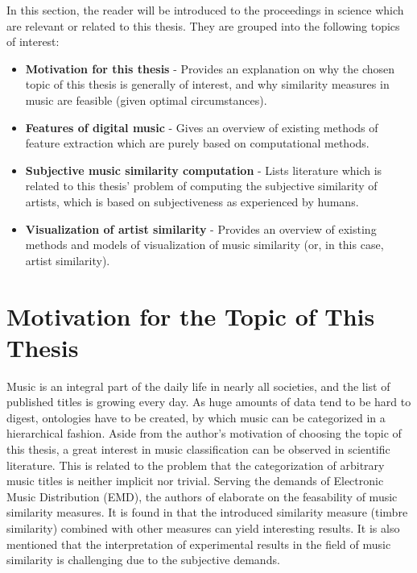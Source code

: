 In this section, the reader will be introduced to the proceedings in science which are
relevant or related to this thesis. They are grouped into the following topics of interest:

\begin{itemize}
	\item \textbf {Motivation for this thesis} - Provides an explanation on why the chosen 
		  topic of this thesis is generally of interest, and why similarity measures in music are feasible
		  (given optimal circumstances).
	\item \textbf {Features of digital music} - Gives an overview of existing methods of 
		  feature extraction which are purely based on computational methods.
	\item \textbf {Subjective music similarity computation} - Lists literature which is related
		  to this thesis' problem of computing the subjective similarity of artists, which is
		  based on subjectiveness as experienced by humans.
	\item \textbf {Visualization of artist similarity} - Provides an overview of existing 
		  methods and models of visualization of music similarity (or, in this case, artist similarity).
\end{itemize}

\section{Motivation for the Topic of This Thesis}

Music is an integral part of the daily life in nearly all societies, and the list of published titles 
is growing every day. As huge amounts of data tend to be hard to digest, ontologies have to be created, 
by which music can be categorized in a hierarchical fashion. Aside from the author's motivation of 
choosing the topic of this thesis, a great interest in music classification can be observed in scientific 
literature. This is related to the problem that the categorization of arbitrary music titles
is neither implicit nor trivial.
Serving the demands of Electronic Music Distribution (EMD), the authors of \cite{pachet:02g} elaborate
on the feasability of music similarity measures. It is found in \cite{pachet:02g} that the introduced
similarity measure (timbre similarity) combined with other measures can yield interesting results. It is
also mentioned that the interpretation of experimental results in the field of music similarity is challenging
due to the subjective demands. 

